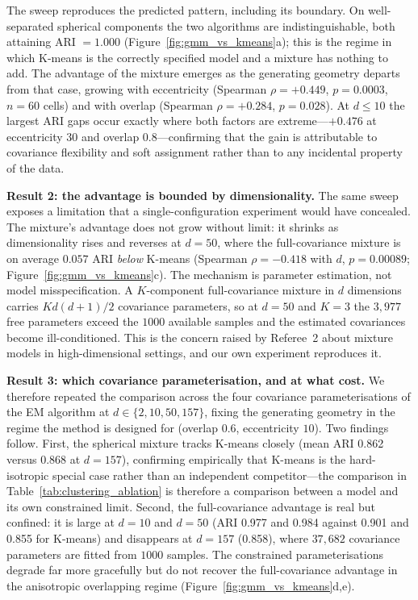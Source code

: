 \documentclass[lettersize,journal]{IEEEtran}
\newcommand{\tfourhighlight}[1]{{\color{tier4blue}#1}}
\begin{document}
		\tfourhighlight{\noindent The sweep reproduces the predicted pattern, including its boundary. On well-separated spherical components the two algorithms are indistinguishable, both attaining ARI $= 1.000$ (Figure~\ref{fig:gmm_vs_kmeans}a); this is the regime in which K-means is the correctly specified model and a mixture has nothing to add. The advantage of the mixture emerges as the generating geometry departs from that case, growing with eccentricity (Spearman $\rho = +0.449$, $p = 0.0003$, $n = 60$ cells) and with overlap (Spearman $\rho = +0.284$, $p = 0.028$). At $d \leq 10$ the largest ARI gaps occur exactly where both factors are extreme---$+0.476$ at eccentricity $30$ and overlap $0.8$---confirming that the gain is attributable to covariance flexibility and soft assignment rather than to any incidental property of the data.}
		
		\tfourhighlight{\noindent \textbf{Result 2: the advantage is bounded by dimensionality.} The same sweep exposes a limitation that a single-configuration experiment would have concealed. The mixture's advantage does not grow without limit: it shrinks as dimensionality rises and reverses at $d = 50$, where the full-covariance mixture is on average $0.057$ ARI \emph{below} K-means (Spearman $\rho = -0.418$ with $d$, $p = 0.00089$; Figure~\ref{fig:gmm_vs_kmeans}c). The mechanism is parameter estimation, not model misspecification. A $K$-component full-covariance mixture in $d$ dimensions carries $Kd(d+1)/2$ covariance parameters, so at $d = 50$ and $K = 3$ the $3{,}977$ free parameters exceed the $1000$ available samples and the estimated covariances become ill-conditioned. This is the concern raised by Referee~2 about mixture models in high-dimensional settings, and our own experiment reproduces it.}
		
		\tfourhighlight{\noindent \textbf{Result 3: which covariance parameterisation, and at what cost.} We therefore repeated the comparison across the four covariance parameterisations of the EM algorithm at $d \in \{2, 10, 50, 157\}$, fixing the generating geometry in the regime the method is designed for (overlap $0.6$, eccentricity $10$). Two findings follow. First, the spherical mixture tracks K-means closely (mean ARI 0.862 versus 0.868 at $d=157$), confirming empirically that K-means is the hard-isotropic special case rather than an independent competitor---the comparison in Table~\ref{tab:clustering_ablation} is therefore a comparison between a model and its own constrained limit. Second, the full-covariance advantage is real but confined: it is large at $d = 10$ and $d = 50$ (ARI 0.977 and 0.984 against 0.901 and 0.855 for K-means) and disappears at $d = 157$ (0.858), where $37{,}682$ covariance parameters are fitted from $1000$ samples. The constrained parameterisations degrade far more gracefully but do not recover the full-covariance advantage in the anisotropic overlapping regime (Figure~\ref{fig:gmm_vs_kmeans}d,e).}
		
\end{document}
